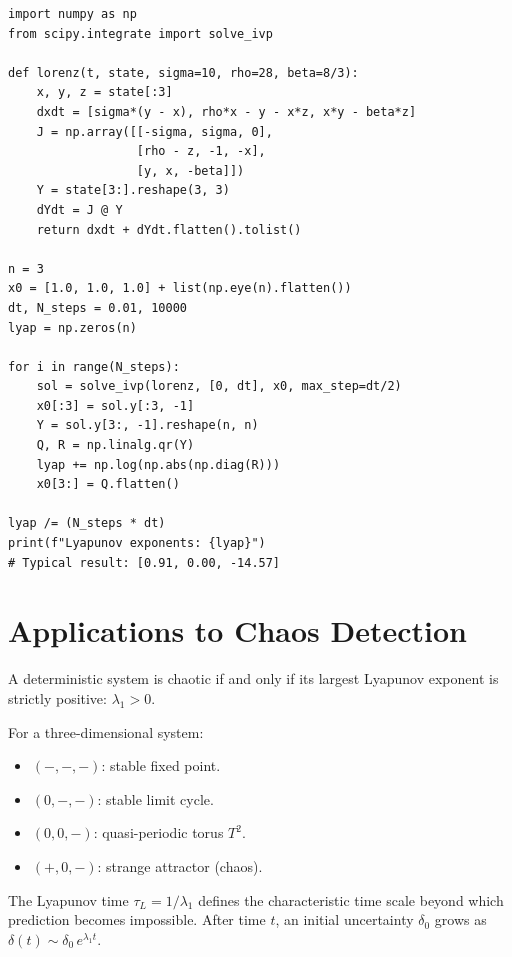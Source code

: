 \begin{codeblock}[title=\textbf{Lyapunov exponents of the Lorenz system}]
\begin{verbatim}
import numpy as np
from scipy.integrate import solve_ivp

def lorenz(t, state, sigma=10, rho=28, beta=8/3):
    x, y, z = state[:3]
    dxdt = [sigma*(y - x), rho*x - y - x*z, x*y - beta*z]
    J = np.array([[-sigma, sigma, 0],
                  [rho - z, -1, -x],
                  [y, x, -beta]])
    Y = state[3:].reshape(3, 3)
    dYdt = J @ Y
    return dxdt + dYdt.flatten().tolist()

n = 3
x0 = [1.0, 1.0, 1.0] + list(np.eye(n).flatten())
dt, N_steps = 0.01, 10000
lyap = np.zeros(n)

for i in range(N_steps):
    sol = solve_ivp(lorenz, [0, dt], x0, max_step=dt/2)
    x0[:3] = sol.y[:3, -1]
    Y = sol.y[3:, -1].reshape(n, n)
    Q, R = np.linalg.qr(Y)
    lyap += np.log(np.abs(np.diag(R)))
    x0[3:] = Q.flatten()

lyap /= (N_steps * dt)
print(f"Lyapunov exponents: {lyap}")
# Typical result: [0.91, 0.00, -14.57]
\end{verbatim}
\end{codeblock}

\section{Applications to Chaos Detection}

\begin{proposition}
A deterministic system is chaotic if and only if its largest Lyapunov exponent
is strictly positive: $\lambda_1 > 0$.
\end{proposition}

\begin{example}
For a three-dimensional system:
\begin{itemize}
    \item $(-, -, -)$: stable fixed point.
    \item $(0, -, -)$: stable limit cycle.
    \item $(0, 0, -)$: quasi-periodic torus $T^2$.
    \item $(+, 0, -)$: strange attractor (chaos).
\end{itemize}
\end{example}

\begin{lemma}
The Lyapunov time $\tau_L = 1/\lambda_1$ defines the characteristic time
scale beyond which prediction becomes impossible. After time $t$, an initial
uncertainty $\delta_0$ grows as $\delta(t) \sim \delta_0\,e^{\lambda_1 t}$.
\end{lemma}

